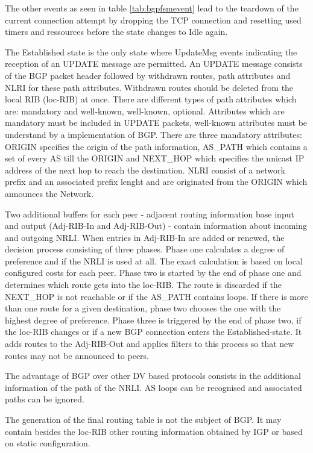\documentclass{acm_proc_article-sp}
\begin{document}
The other events as seen in table \ref{tab:bgpfsmevent} lead to the teardown of the current connection attempt by dropping the TCP connection and resetting used timers and ressources before the state changes to Idle again.

The Established state is the only state where UpdateMsg events indicating the reception of an UPDATE message are permitted. An UPDATE message consists of the BGP packet header followed by withdrawn routes, path attributes and NLRI for these path attributes. Withdrawn routes should be deleted from the local RIB (loc-RIB) at once. There are different types of path attributes which are: mandatory and well-known, well-known, optional. Attributes which are mandatory must be included in UPDATE packets, well-known attributes must be understand by a implementation of BGP. There are three mandatory attributes: ORIGIN specifies the origin of the path information, AS\_PATH which contains a set of every AS till the ORIGIN and NEXT\_HOP which specifies the unicast IP address of the next hop to reach the destination. NLRI consist of a network prefix and an associated prefix lenght and are originated from the ORIGIN which announces the Network.

Two additional buffers for each peer - adjacent routing information base input and output (Adj-RIB-In and Adj-RIB-Out) - contain information about incoming and outgoing NRLI. When entries in Adj-RIB-In are added or renewed, the decision process consisting of three phases. Phase one calculates a degree of preference and if the NRLI is used at all. The exact calculation is based on local configured costs for each peer. Phase two is started by the end of phase one and determines which route gets into the loc-RIB. The route is discarded if the NEXT\_HOP is not reachable or if the AS\_PATH contains loops. If there is more than one route for a given destination, phase two chooses the one with the highest degree of preference. Phase three is triggered by the end of phase two, if the loc-RIB changes or if a new BGP connection enters the Established-state. It adds routes to the Adj-RIB-Out and applies filters to this process so that new routes may not be announced to peers.

The advantage of BGP over other DV based protocols consists in the additional information of the path of the NRLI. AS loops can be recognised and associated paths can be ignored.

The generation of the final routing table is not the subject of BGP. It may contain besides the loc-RIB other routing information obtained by IGP or based on static configuration.
\end{document}
